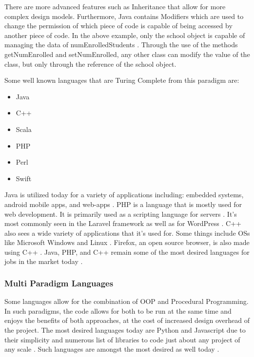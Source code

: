 There are more advanced features such as Inheritance that allow for more complex design models.
Furthermore, Java contains Modifiers which are used to change the permission of which piece of code is capable of being accessed by another piece of code.
In the above example, only the school object is capable of managing the data of numEnrolledStudents \cite{CSUNStudents}.
Through the use of the methods getNumEnrolled and setNumEnrolled, any other class can modify the value of the class, but only through the reference of the school object.

Some well known languages that are Turing Complete from this paradigm are: 
\begin{itemize}
    \item Java
    \item C++
    \item Scala
    \item PHP
    \item Perl
    \item Swift        
\end{itemize}

Java is utilized today for a variety of applications including: embedded systems, android mobile apps, and web-apps \cite{JavaUse1, JavaUse2}.
PHP is a language that is mostly used for web development.
It is primarily used as a scripting language for servers \cite{PHPScriptingServer}.
It's most commonly seen in the Laravel framework as well as for WordPress \cite{PHPLaravel,PHPWP}.
C++ also sees a wide variety of applications that it's used for.
Some things include OSs like Microsoft Windows and Linux \cite{CPPUse1,CPPUse2}.
Firefox, an open source browser, is also made using C++ \cite{CPPFirefox,FirefoxMain}.
Java, PHP, and C++ remain some of the most desired languages for jobs in the market today \cite{TopLangs1,TopLangs2,TopLangs3}.

\subsubsection{Multi Paradigm Languages}\label{subsubsec:MultiParadigmPL}

Some languages allow for the combination of OOP and Procedural Programming.
In such paradigms, the code allows for both to be run at the same time and enjoys the benefits of both approaches, at the cost of increased design overhead of the project.
The most desired languages today are Python and Javascript due to their simplicity and numerous list of libraries to code just about any project of any scale \cite{EasyLangs1,EasyLangs2,PyLibs,NPM,Yarn}.
Such languages are amongst the most desired as well today \cite{TopLangs1,TopLangs2,TopLangs3}.

